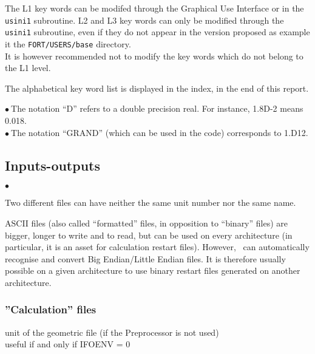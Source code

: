 The L1 key words can be modifed through the Graphical Use Interface or
in the \texttt{usini1} subroutine. L2 and L3 key words can only be modified through
the \texttt{usini1} subroutine, even if they do not appear in the version proposed
as example it the \texttt{FORT/USERS/base} directory.\\
It is however recommended not to modify the key words which do not belong to the L1
level.

The alphabetical key word list is displayed in the index, in the end of
this report.

$\bullet\ $The notation ``D'' refers to a double precision real. For
           instance, 1.8D-2 means 0.018. \\
$\bullet\ $The notation ``GRAND'' (which can be used in the code)
corresponds to 1.D12.

\subsection{Inputs-outputs}

\begin{list}{$\bullet$}{}
\item Two different files can have neither the same unit number nor the
      same name.
\item  ASCII files (also called ``formatted'' files, in opposition to
      ``binary'' files) are bigger, longer to write and to read, but can
      be used on every architecture (in particular, it is an asset for
      calculation restart files). However, \CS\ can automatically recognise and
      convert Big Endian/Little Endian files. It is therefore usually possible on
      a given architecture to use binary restart files generated on another
      architecture.
 \end{list}

\subsubsection{''Calculation'' files}



{unit of the geometric file (if the Preprocessor is not used)\\
useful if and only if IFOENV = 0}

